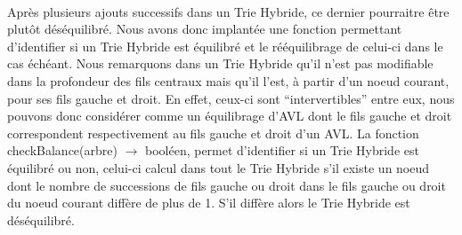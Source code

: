 \documentclass[a4paper,12pt]{report}
\begin{document}
\paragraph{}
Après plusieurs ajouts successifs dans un Trie Hybride, ce dernier pourraitre être plutôt déséquilibré. Nous avons donc implantée
une fonction permettant d'identifier si un Trie Hybride est équilibré et le rééquilibrage de celui-ci dans le cas échéant.
Nous remarquons dans un Trie Hybride qu'il n'est pas modifiable dans la profondeur des fils centraux mais qu'il l'est, à
partir d'un noeud courant, pour ses fils gauche et droit. En effet, ceux-ci sont ``intervertibles'' entre eux, nous pouvons donc
considérer comme un équilibrage d'AVL dont le fils gauche et droit correspondent respectivement au fils gauche et droit d'un AVL.
La fonction checkBalance(arbre) $\rightarrow$ booléen, permet d'identifier si un Trie Hybride est équilibré ou non, celui-ci
calcul dans tout le Trie Hybride s'il existe un noeud dont le nombre de successions de fils gauche ou droit dans le fils gauche ou 
droit du noeud courant diffère de plus de 1. S'il diffère alors le Trie Hybride est déséquilibré.
\end{document}
